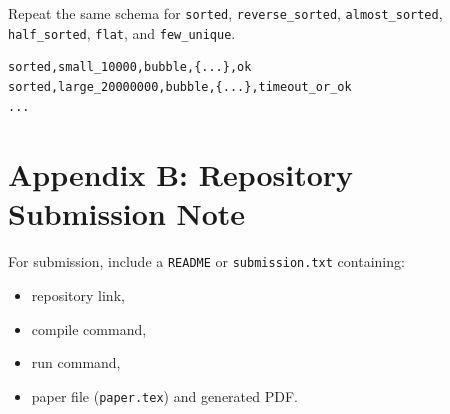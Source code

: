 \documentclass[12pt,a4paper]{article}
\begin{document}
\noindent Repeat the same schema for \texttt{sorted}, \texttt{reverse\_sorted}, \texttt{almost\_sorted}, \texttt{half\_sorted}, \texttt{flat}, and \texttt{few\_unique}.
\begin{lstlisting}
sorted,small_10000,bubble,{...},ok
sorted,large_20000000,bubble,{...},timeout_or_ok
...
\end{lstlisting}

\section{Appendix B: Repository Submission Note}
For submission, include a \texttt{README} or \texttt{submission.txt} containing:
\begin{itemize}
    \item repository link,
    \item compile command,
    \item run command,
    \item paper file (\texttt{paper.tex}) and generated PDF.
\end{itemize}
\end{document}
